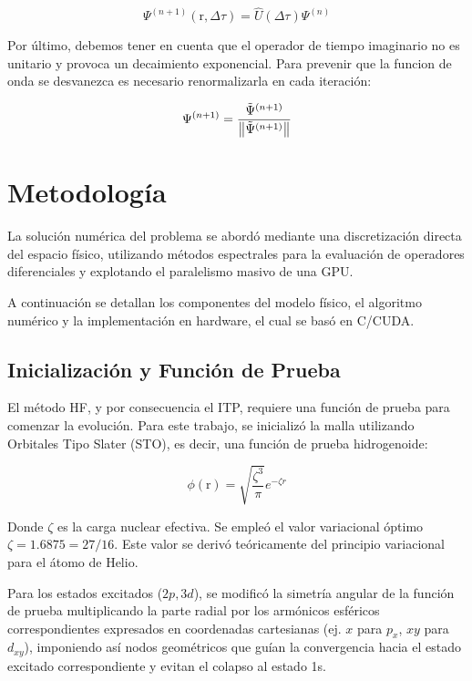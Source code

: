 \documentclass[aps,twocolumn,preprintnumbers]{revtex4}
\begin{document}
  \begin{equation}
    \Psi^{(n+1)}(\bm{\mathrm{r}}, \Delta\tau) = \hat{U}(\Delta\tau)\Psi^{(n)}
  \end{equation}

  Por último, debemos tener en cuenta que el operador de tiempo imaginario no es unitario y provoca un decaimiento exponencial. Para prevenir que la funcion de onda se desvanezca es necesario renormalizarla en cada iteración:

  \begin{equation} \label{eq:som}
    \Psi^{(n+1)} = \frac{\tilde{\Psi}^{(n+1)}}{\norm{\tilde{\Psi}^{(n+1)}}}
  \end{equation}

  \section{Metodología}

  La solución numérica del problema se abordó mediante una discretización directa del espacio físico, utilizando métodos espectrales para la evaluación de operadores diferenciales y explotando el paralelismo masivo de una GPU.

  A continuación se detallan los componentes del modelo físico, el algoritmo numérico y la implementación en hardware, el cual se basó en C/CUDA.

  \subsection{Inicialización y Función de Prueba}

  El método HF, y por consecuencia el ITP, requiere una función de prueba para comenzar la evolución. Para este trabajo, se inicializó la malla utilizando Orbitales Tipo Slater (STO), es decir, una función de prueba hidrogenoide:

  \begin{equation}
    \phi(\bm{\mathrm{r}}) = \sqrt{\frac{\zeta^3}{\pi}}e^{-\zeta r}
  \end{equation}

  Donde $\zeta$ es la carga nuclear efectiva. Se empleó el valor variacional óptimo $\zeta= 1.6875 = 27/16$. Este valor se derivó teóricamente del principio variacional para el átomo de Helio.

  Para los estados excitados ($2p,3d$), se modificó la simetría angular de la función de prueba multiplicando la parte radial por los armónicos esféricos correspondientes expresados en coordenadas cartesianas (ej. $x$ para $p_x$, $xy$ para $d_{xy}$), imponiendo así nodos geométricos que guían la convergencia hacia el estado excitado correspondiente y evitan el colapso al estado 1s.
\end{document}
